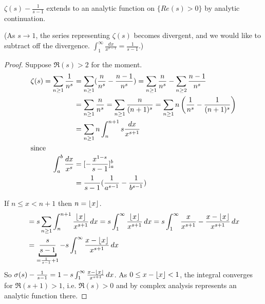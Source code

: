\documentclass{article}
\DeclarePairedDelimiter\floor{\lfloor}{\rfloor}
\begin{document}
\begin{nthm}\label{thm:5.5}
    $\zeta(s) - \frac{1}{s-1}$ extends to an analytic function on $\{Re(s) > 0\}$ by analytic continuation.
\end{nthm}
(As $s \to 1$, the series representing $\zeta(s)$ becomes divergent, and we would like to subtract off the divergence. $\int_1^\infty \frac{dx}{x^{s-1}} = \frac{1}{s-1}$.)

\begin{proof}
    Suppose $\Re(s) > 2$ for the moment.
    \begin{align*}
        \zeta(s) = \sum_{n \geq 1} \frac{1}{n^s} &= \sum_{n \geq 1} (\frac{n}{n^s} - \frac{n-1}{n^s}) = \sum_{n \geq 1} \frac{n}{n^s} - \sum_{n \geq 2} \frac{n-1}{n^s} \\
                                                 &= \sum_{n \geq 1} \frac{n}{n^s} = \sum_{n \geq 1} \frac{n}{(n+1)^s} = \sum_{n \geq 1} n \left(\frac{1}{n^s} - \frac{1}{(n+1)^s}\right) \\
                                                 &= \sum_{n \geq 1} n \int_n^{n+1} s \frac{dx}{x^{s+1}} \\
        \shortintertext{since}
        \int_a^b \frac{dx}{x^s} &= [- \frac{x^{1-s}}{s-1}]_a^b \\
                                &= \frac{1}{s-1}(\frac{1}{a^{s-1}} - \frac{1}{b^{s-1}})
    \end{align*}

    If $n \leq x < n+1$ then $n = \floor{x}$.
    \begin{align*}
        &= s \sum_{n \geq 1} \int_n^{n+1} \frac{\floor{x}}{x^{s+1}} \, dx = s \int_1^\infty \frac{\floor{x}}{x^{s+1}} \, dx = s \int_1^\infty \frac{x}{x^{s+1}} - \frac{x - \floor{x}}{x^{s+1}} \, dx \\
        &= \underbracket{\frac{s}{s-1}}_{= \frac{1}{s-1} + 1} - s \int_1^\infty \frac{x - \floor{x}}{x^{s+1}} \, dx
    \end{align*}
    So $\sigma(s) - \frac{1}{s-1} = 1 - s \int_1^\infty \frac{x - \floor{x}}{x^{s+1}} \, dx$.
    As $0 \leq x - \floor{x} < 1$, the integral converges for $\Re(s+1) > 1$, i.e. $\Re(s) > 0$ and by complex analysis represents an analytic function there.
\end{proof}
\end{document}
